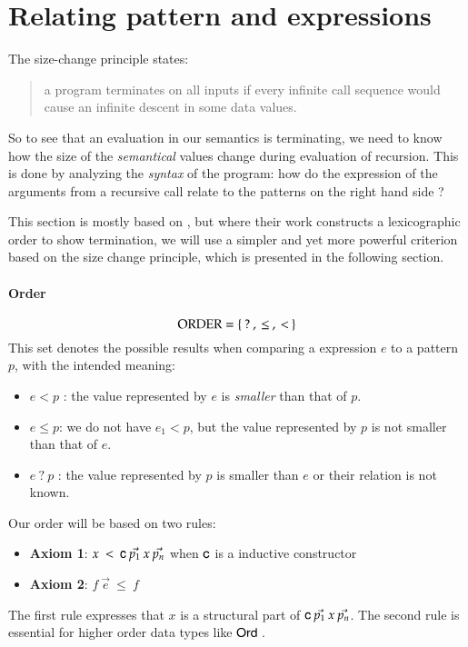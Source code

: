 \newcommand{\order}{\opn{ORDER}}

\section{Relating pattern and expressions}


The size-change principle \cite{lee01sizechange} states:
\begin{quote}
a program terminates on all inputs if every infinite call sequence would cause an infinite descent in some data values.
\end{quote}

So to see that an evaluation in our semantics is terminating, we need to know how the size of the \emph{semantical} values change during evaluation of recursion.
This is done by analyzing the \emph{syntax} of the program: how do the expression of the arguments from a recursive call relate to the patterns on the right hand side ?

This section is mostly based on \cite{abelAltenkirch:predStRec}, but where their work constructs a lexicographic order to show termination, we will use a simpler and yet more powerful criterion based on the size change principle, which is presented in the following section.

\paragraph*{Order}
\[ \order = \{ \: ? \: , \: \leq \: , \: < \: \} \]
\noindent This set denotes the possible results when comparing a expression $e$ to a pattern $p$, with the intended meaning:
\begin{itemize}
\item
$e < p$ : the value represented by $e$ is \emph{smaller} than that of $p$.
\item
$e \leq p $: we do not have $e_1 < p$, but the value represented by $p$ is not smaller than that of $e$.
\item
$e \: ? \: p $ : the value represented by $p$ is smaller than $e$ or their relation is not known.
\end{itemize}
Our order will be based on two rules:
\begin{itemize}
\item
\textbf{Axiom 1}: $x \: < \: \mathsf{c} \: \vec{p_1} \: x \: \vec{p_n} $ when $\mathsf{c}$ is a inductive constructor
\item
\textbf{Axiom 2}: $f \: \vec{e} \: \leq \: f $
\end{itemize}
The first rule expresses that $x$ is a structural part of $\mathsf{c} \: \vec{p_1} \: x \: \vec{p_n}$.
The second rule is essential for higher order data types like $\mathsf{Ord}\:$.


